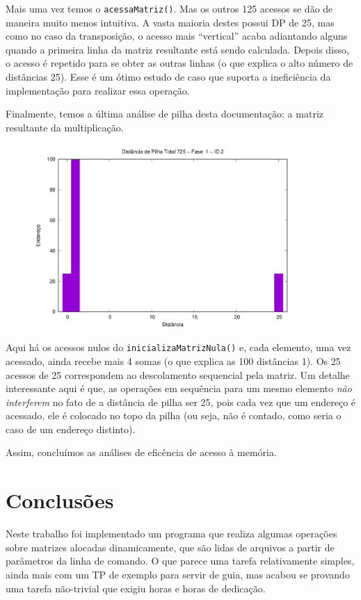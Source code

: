 \documentclass{article}
\def\code#1{\texttt{#1}}
\begin{document}
Mais uma vez temos o \code{acessaMatriz()}. Mas os outros 125 acessos se dão de maneira muito menos intuitiva. A vasta maioria destes possui DP de 25, mas como no caso da transposição, o acesso mais ``vertical'' acaba adiantando alguns quando a primeira linha da matriz resultante está sendo calculada. Depois disso, o acesso é repetido para se obter as outras linhas (o que explica o alto número de distâncias 25). Esse é um ótimo estudo de caso que suporta a ineficiência da implementação para realizar essa operação.

Finalmente, temos a última análise de pilha desta documentação: a matriz resultante da multiplicação.

\begin{figure} [H]
    \includegraphics[width=10cm]{m-hist-1-2.png} 
    \centering
\end{figure}

Aqui há os acessos nulos do \code{inicializaMatrizNula()} e, cada elemento, uma vez acessado, ainda recebe mais 4 somas (o que explica as 100 distâncias 1). Os 25 acessos de 25 correspondem ao descolamento sequencial pela matriz. Um detalhe interessante aqui é que, as operações em sequência para um mesmo elemento \textit{não interferem} no fato de a distância de pilha ser 25, pois cada vez que um endereço é acessado, ele é colocado no topo da pilha (ou seja, não é contado, como seria o caso de um endereço distinto).

Assim, concluímos as análises de eficência de acesso à memória.

\section{Conclusões}

Neste trabalho foi implementado um programa que realiza algumas operações sobre matrizes alocadas dinamicamente, que são lidas de arquivos a partir de parâmetros da linha de comando. O que parece uma tarefa relativamente simples, ainda mais com um TP de exemplo para servir de guia, mas acabou se provando uma tarefa não-trivial que exigiu horas e horas de dedicação.
\end{document}
